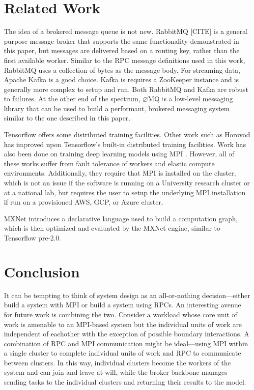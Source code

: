 \documentclass[conference]{IEEEtran}
\begin{document}
\section{Related Work}
The idea of a brokered message queue is not new. RabbitMQ [CITE] is a general
purpose message broker that supports the same functionality demonstrated
in this paper, but messages are delivered based on a routing key, rather than
the first available worker. Similar to the RPC message definitions used in
this work, RabbitMQ uses a collection of bytes as the message body. For
streaming data, Apache Kafka \cite{kafka} is a good choice. Kafka is requires a
ZooKeeper \cite{Hunt:2010:ZWC:1855840.1855851} instance and is generally
more complex to setup and run.
Both RabbitMQ and Kafka are robust to failures. At the other end of the
spectrum, $\varnothing$MQ is a low-level messaging library that can be used
to build a performant, brokered messaging system similar to the one described
in this paper.

Tensorflow \cite{tensorflow2015-whitepaper} offers some distributed training facilities. Other work such
as Horovod \cite{DBLP:journals/corr/abs-1802-05799} has improved upon Tensorflow's
built-in distributed training
facilities. Work has also been done on training deep learning models using
MPI \cite{pmlr-v28-coates13, DBLP:journals/corr/VishnuSD16}. However, all of these works suffer from fault tolerance of workers
and elastic compute environments. Additionally, they require that MPI is installed
on the cluster, which is not an issue if the software is running on a University
research cluster or at a national lab, but requires the user to setup the underlying
MPI installation if run on a provisioned AWS, GCP, or Azure cluster.

MXNet \cite{DBLP:journals/corr/ChenLLLWWXXZZ15} introduces a declarative language
used to build a computation graph, which is then optimized and evaluated by the
MXNet engine, similar to Tensorflow pre-2.0.
\section{Conclusion}
It can be tempting to think of system design as an all-or-nothing
decision---either build a system with MPI or build a system using RPCs. An
interesting avenue for future work is combining the two. Consider a workload
whose core unit of work is amenable to an MPI-based system but the individual
units of work are independent of eachother with the exception of possible
boundary interactions. A combination of RPC and MPI communication might be
ideal---using MPI within a single cluster to complete individual units of work
and RPC to communicate between clusters. In this way, individual clusters become
the workers of the system and can join and leave at will, while the broker
backbone manages sending tasks to the individual clusters and returning their
results to the model.



\end{document}
